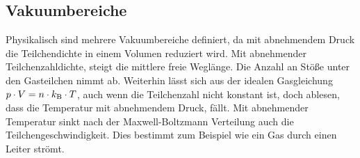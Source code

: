 	\subsection{Vakuumbereiche}

		\noindent
		Physikalisch sind mehrere Vakuumbereiche definiert, da mit abnehmendem Druck die Teilchendichte in einem Volumen reduziert wird.
		Mit abnehmender Teilchenzahldichte, steigt die mittlere freie Weglänge. 
		Die Anzahl an Stöße unter den Gasteilchen nimmt ab.
		Weiterhin lässt sich aus der idealen Gasgleichung $p \cdot V = n \cdot k_{\text{B}} \cdot T $, auch wenn die Teilchenzahl nicht konstant ist, doch ablesen, dass die Temperatur mit abnehmendem Druck, fällt. 	
		Mit abnehmender Temperatur sinkt nach der Maxwell-Boltzmann Verteilung auch die Teilchengeschwindigkeit.	
		Dies bestimmt zum Beispiel wie ein Gas durch einen Leiter strömt.
		
